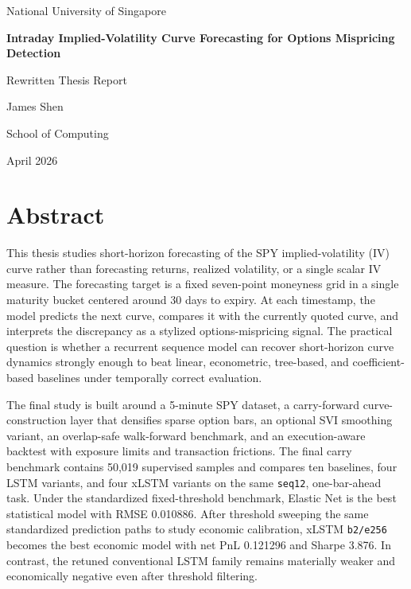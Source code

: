\documentclass[12pt]{report}
\newcommand{\code}[1]{\texttt{#1}}
\begin{document}
\hypersetup{pageanchor=false}

\begin{titlepage}
\centering
{\Large National University of Singapore\par}
\vspace{1.5cm}
{\Huge\bfseries Intraday Implied-Volatility Curve Forecasting for Options Mispricing Detection\par}
\vspace{0.8cm}
{\Large Rewritten Thesis Report\par}
\vspace{2cm}
{\large James Shen\par}
{\large School of Computing\par}
\vfill
{\large April 2026\par}
\end{titlepage}

\chapter*{Abstract}
This thesis studies short-horizon forecasting of the SPY implied-volatility (IV) curve rather than forecasting returns, realized volatility, or a single scalar IV measure. The forecasting target is a fixed seven-point moneyness grid in a single maturity bucket centered around 30 days to expiry. At each timestamp, the model predicts the next curve, compares it with the currently quoted curve, and interprets the discrepancy as a stylized options-mispricing signal. The practical question is whether a recurrent sequence model can recover short-horizon curve dynamics strongly enough to beat linear, econometric, tree-based, and coefficient-based baselines under temporally correct evaluation.

The final study is built around a 5-minute SPY dataset, a carry-forward curve-construction layer that densifies sparse option bars, an optional SVI smoothing variant, an overlap-safe walk-forward benchmark, and an execution-aware backtest with exposure limits and transaction frictions. The final carry benchmark contains 50,019 supervised samples and compares ten baselines, four LSTM variants, and four xLSTM variants on the same \code{seq12}, one-bar-ahead task. Under the standardized fixed-threshold benchmark, Elastic Net is the best statistical model with RMSE 0.010886. After threshold sweeping the same standardized prediction paths to study economic calibration, xLSTM \code{b2/e256} becomes the best economic model with net PnL 0.121296 and Sharpe 3.876. In contrast, the retuned conventional LSTM family remains materially weaker and economically negative even after threshold filtering.
\end{document}
